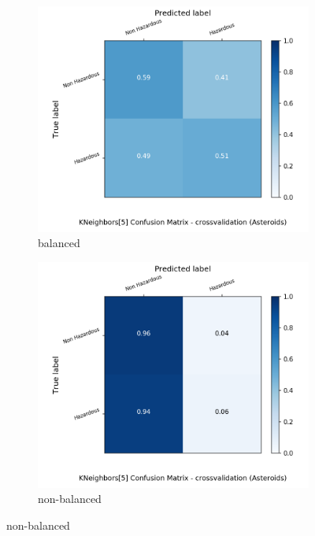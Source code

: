 \begin{figure}[H]
	\centering
	\begin{subfigure}{.5\textwidth}
		\centering
		\includegraphics[width=1.1\textwidth]{Plots/asteroids/asteroids_KNeighbors_5_balance_True_crossvalidation.png}
		\caption{balanced}
	\end{subfigure}%
	\begin{subfigure}{.5\textwidth}
		\centering
		\includegraphics[width=1.1\textwidth]{Plots/asteroids/asteroids_KNeighbors_5_balance_False_crossvalidation.png}
		\caption{non-balanced}
	\end{subfigure}
\end{figure}

